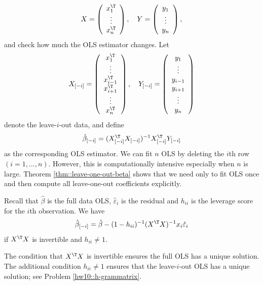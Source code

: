 \[
X=\left(\begin{array}{c}
x_{1}^{\T}\\
\vdots\\
x_{n}^{\T}
\end{array}\right),\quad Y=\left(\begin{array}{c}
y_{1}\\
\vdots\\
y_{n}
\end{array}\right),
\]
and check how much the OLS estimator changes. Let 
$$
X_{[-i]} = \left(\begin{array}{c}
x_{1}^{\T}\\
\vdots\\
x_{i-1}^{\T} \\
x_{i+1}^{\T} \\
\vdots\\
x_{n}^{\T}
\end{array}\right),\quad 
Y_{[-i]} = \left(\begin{array}{c}
y_{1}\\
\vdots\\
y_{i-1} \\
y_{i+1} \\
\vdots\\
y_{n}
\end{array}\right)
$$ 
denote the leave-$i$-out data, and define
\begin{equation}
\hat{\beta}_{[-i]}=(X_{[-i]}^{\T}X_{[-i]})^{-1}X_{[-i]}^{\T}Y_{[-i]}\label{eq:delete1ols}
\end{equation}
as the corresponding OLS estimator. We can fit $n$ OLS by deleting
the $i$th row $(i=1,\ldots,n)$. However, this is computationally
intensive especially when $n$ is large. Theorem \ref{thm::leave-one-out-beta} shows that we need only to fit OLS once and then compute all leave-one-out coefficients explicitly.




\begin{theorem}\label{thm::leave-one-out-beta}
Recall that $\hat{\beta}$ is the full data OLS, $\hat{\varepsilon}_{i}$
is the residual and $h_{ii}$ is the leverage score for the $i$th
observation. We have
\[
\hat{\beta}_{[-i]}=\hat{\beta}-(1-h_{ii})^{-1}(X^{\T}X)^{-1}x_{i}\hat{\varepsilon}_{i}
\]
if $X^{\T}X$ is invertible and $h_{ii} \neq 1$. 
\end{theorem}


The condition that $X^{\T}X$ is invertible ensures the full OLS has a unique solution. The additional condition $h_{ii} \neq 1$ ensures that the leave-$i$-out OLS has a unique solution; see Problem \ref{hw10::h-grammatrix}.




